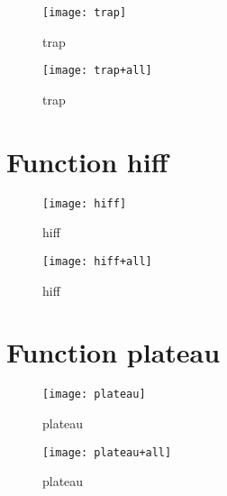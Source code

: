 \begin{center}
\begin{figure}[h]
\centering
\texttt{[image: trap]}
\caption{trap}
\end{figure}
\end{center}

\begin{center}
\begin{figure}[h]
\centering
\texttt{[image: trap+all]}
\caption{trap}
\end{figure}
\end{center}

\newpage

\section{Function hiff}
\begin{center}

\end{center}

\begin{center}
\begin{figure}[h]
\centering
\texttt{[image: hiff]}
\caption{hiff}
\end{figure}
\end{center}

\begin{center}
\begin{figure}[h]
\centering
\texttt{[image: hiff+all]}
\caption{hiff}
\end{figure}
\end{center}

\newpage

\section{Function plateau}
\begin{center}

\end{center}

\begin{center}
\begin{figure}[h]
\centering
\texttt{[image: plateau]}
\caption{plateau}
\end{figure}
\end{center}

\begin{center}
\begin{figure}[h]
\centering
\texttt{[image: plateau+all]}
\caption{plateau}
\end{figure}
\end{center}

